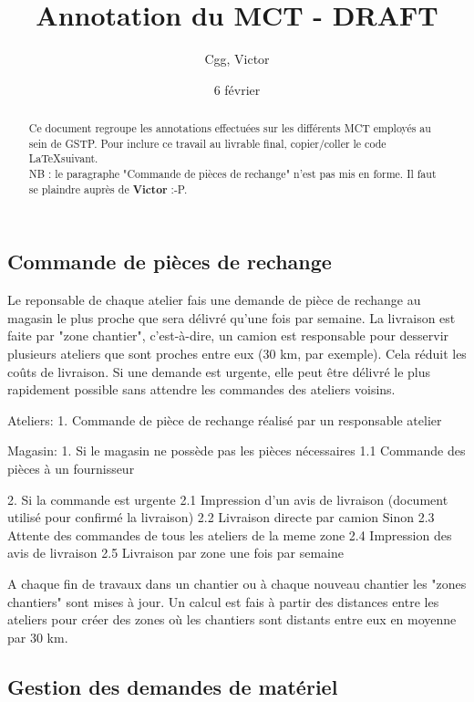\documentclass[a4paper]{article}
\title{Annotation du MCT - DRAFT}
\author{Cgg, Victor}
\date{6 février}
\begin{document}
\maketitle

\begin{abstract}
Ce document regroupe les annotations effectuées sur les différents MCT
employés au sein de GSTP. Pour inclure ce travail au livrable final,
copier/coller le code \LaTeX suivant.\\
NB : le paragraphe "Commande de pièces de rechange" n'est pas mis en forme.
Il faut se plaindre auprès de \textbf{Victor} :-P.
\end{abstract}

\subsection{Commande de pièces de rechange}

Le reponsable de chaque atelier fais une demande de pièce de rechange au
magasin le plus proche que sera délivré qu'une fois par semaine.  La
livraison est faite par "zone chantier", c'est-à-dire, un camion est
responsable pour desservir plusieurs ateliers que sont proches entre eux
(30 km, par exemple). Cela réduit les coûts de livraison.
Si une demande est urgente, elle peut être délivré le plus rapidement
possible sans attendre les commandes des ateliers voisins.

Ateliers:
1. Commande de pièce de rechange réalisé par un responsable atelier

Magasin:
1. Si le magasin ne possède pas les pièces nécessaires
1.1	Commande des pièces à un fournisseur

2. Si la commande est urgente
2.1	Impression d'un avis de livraison (document utilisé pour confirmé la livraison)
2.2	Livraison directe par camion
   Sinon
2.3	Attente des commandes de tous les ateliers de la meme zone
2.4	Impression des avis de livraison
2.5	Livraison par zone une fois par semaine

A chaque fin de travaux dans un chantier ou à chaque nouveau chantier les
"zones chantiers" sont mises à jour. Un calcul est fais à partir des
distances entre les ateliers pour créer des zones où les chantiers sont
distants entre eux en moyenne par 30 km.


\subsection{Gestion des demandes de matériel}
\end{document}
